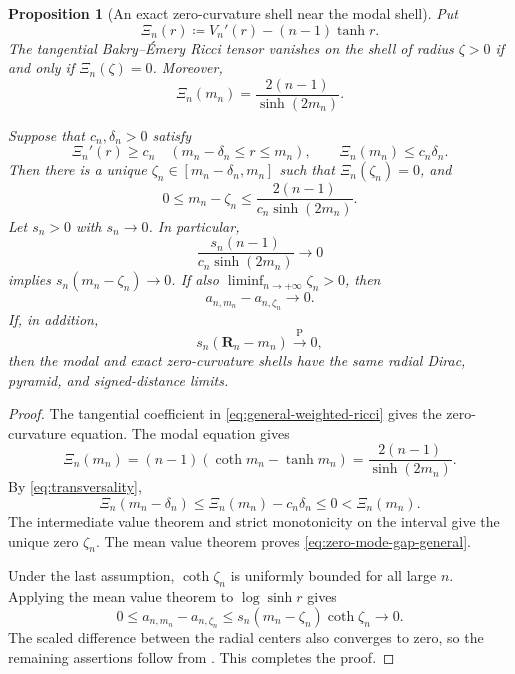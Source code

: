 \documentclass{amsart}
\numberwithin{equation}{section}
\theoremstyle{plain}
\newtheorem{prop}[thm]{Proposition}
\theoremstyle{definition}
\theoremstyle{remark}
\begin{document}
\begin{prop}[An exact zero-curvature shell near the modal shell]
\label{prop:zero-shell-transversality}
	Put
\begin{equation}\label{eq:F-zero} \Xi_n(r)\coloneqq V_n'(r)-(n-1)\tanh r. \end{equation}
	The tangential Bakry--\'Emery Ricci tensor vanishes on the shell of
	radius $\zeta>0$ if and only if $\Xi_n(\zeta)=0$.  Moreover,
\begin{equation}\label{eq:F-at-mode} \Xi_n(m_n)=\frac{2(n-1)}{\sinh(2m_n)}. \end{equation}

	Suppose that $c_n,\delta_n>0$ satisfy
	\begin{equation}\label{eq:transversality}
		\Xi_n'(r)\ge c_n
		\quad(m_n-\delta_n\le r\le m_n),
		\qquad
		\Xi_n(m_n)\le c_n\delta_n.
	\end{equation}
	Then there is a unique
	$\zeta_n\in[m_n-\delta_n,m_n]$ such that $\Xi_n(\zeta_n)=0$, and
	\begin{equation}\label{eq:zero-mode-gap-general}
		0\le m_n-\zeta_n
		\le
		\frac{2(n-1)}{c_n\sinh(2m_n)}.
	\end{equation}
	Let $s_n>0$ with $s_n\to0$.  In particular,
	\begin{equation}\label{eq:zero-mode-scaled-gap}
		\frac{s_n(n-1)}{c_n\sinh(2m_n)}
		\longrightarrow0
	\end{equation}
	implies $s_n(m_n-\zeta_n)\to0$.  If also
	$\liminf_{n\to+\infty}\zeta_n>0$, then
	\[
		a_{n,m_n}-a_{n,\zeta_n}\longrightarrow0.
	\]
	If, in addition,
	\[
		s_n(\mathbf R_n-m_n)\overset{\mathrm P}{\longrightarrow}0,
	\]
	then the modal and exact zero-curvature shells have the same radial
	Dirac, pyramid, and signed-distance limits.
\end{prop}

\begin{proof}
	The tangential coefficient in \eqref{eq:general-weighted-ricci} gives the
	zero-curvature equation.  The modal equation gives
\[ \Xi_n(m_n) = (n-1)(\coth m_n-\tanh m_n) = \frac{2(n-1)}{\sinh(2m_n)}. \]
	By \eqref{eq:transversality},
\[ \Xi_n(m_n-\delta_n) \le \Xi_n(m_n)-c_n\delta_n \le0 < \Xi_n(m_n). \]
	The intermediate value theorem and strict monotonicity on the interval
	give the unique zero $\zeta_n$.  The mean value theorem proves
	\eqref{eq:zero-mode-gap-general}.

	Under the last assumption, $\coth\zeta_n$ is uniformly bounded for all
	large $n$.  Applying the mean value theorem to $\log\sinh r$ gives
\[ 0\le a_{n,m_n}-a_{n,\zeta_n} \le s_n(m_n-\zeta_n)\coth\zeta_n \longrightarrow0. \]
	The scaled difference between the radial centers also converges to zero,
	so the remaining assertions follow from .
	This completes the proof.
\end{proof}
\end{document}
